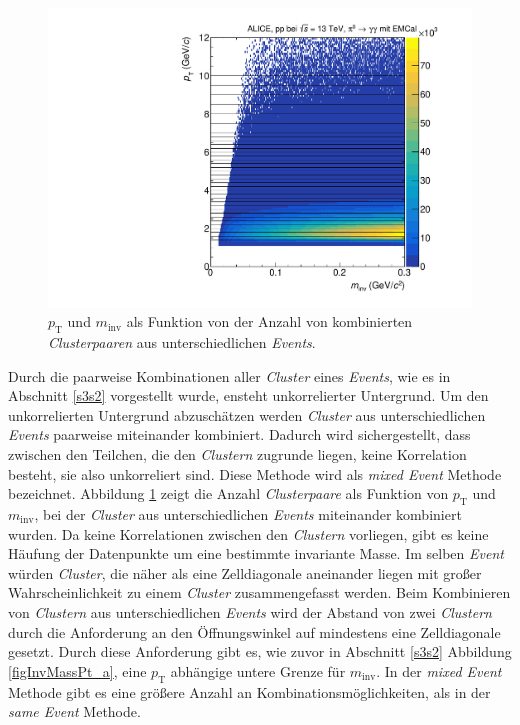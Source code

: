 \begin{figure}[t!]
\centering
\includegraphics[width=.7\linewidth]{hInvMass_pT_Bkg.pdf}
\caption{$p_\text{T}$ und $m_\text{inv}$ als Funktion von der Anzahl von kombinierten  \textit{Clusterpaaren} aus unterschiedlichen \textit{Events}.}
\label{figInvMassPt_b}
\end{figure}
Durch die paarweise Kombinationen aller \textit{Cluster} eines \textit{Events}, wie es in Abschnitt \ref{s3s2} vorgestellt wurde, ensteht unkorrelierter Untergrund.
Um den unkorrelierten Untergrund abzuschätzen werden \textit{Cluster} aus unterschiedlichen \textit{Events} paarweise miteinander kombiniert.
Dadurch wird sichergestellt, dass zwischen den Teilchen, die den \textit{Clustern} zugrunde liegen, keine Korrelation besteht, sie also unkorreliert sind.
Diese Methode wird als \textit{mixed Event} Methode bezeichnet.
Abbildung \ref{figInvMassPt_b} zeigt die Anzahl \textit{Clusterpaare} als Funktion von $p_\text{T}$ und $m_\text{inv}$, bei der \textit{Cluster} aus unterschiedlichen \textit{Events} miteinander kombiniert wurden.
Da keine Korrelationen zwischen den \textit{Clustern} vorliegen, gibt es keine Häufung der Datenpunkte um eine bestimmte invariante Masse.
\newline
Im selben \textit{Event} würden \textit{Cluster}, die näher als eine Zelldiagonale aneinander liegen mit großer Wahrscheinlichkeit zu einem \textit{Cluster} zusammengefasst werden.
Beim Kombinieren von \textit{Clustern} aus unterschiedlichen \textit{Events} wird der Abstand von zwei \textit{Clustern} durch die Anforderung an den Öffnungswinkel auf mindestens eine Zelldiagonale gesetzt.
Durch diese Anforderung gibt es, wie zuvor in Abschnitt \ref{s3s2} Abbildung \ref{figInvMassPt_a}, eine $p_\text{T}$ abhängige untere Grenze für $m_\text{inv}$.
\newline
In der \textit{mixed Event} Methode gibt es eine größere Anzahl an Kombinationsmöglichkeiten, als in der \textit{same Event} Methode.
